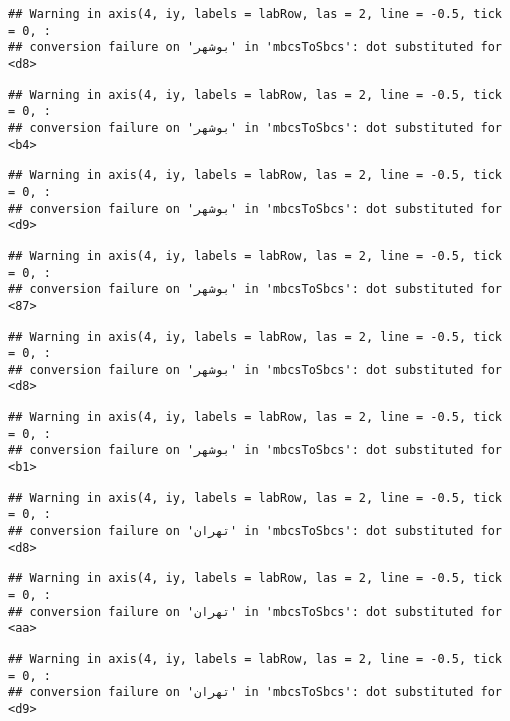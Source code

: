 \documentclass[
]{article}
\begin{document}
\begin{verbatim}
## Warning in axis(4, iy, labels = labRow, las = 2, line = -0.5, tick = 0, :
## conversion failure on 'بوشهر' in 'mbcsToSbcs': dot substituted for <d8>
\end{verbatim}

\begin{verbatim}
## Warning in axis(4, iy, labels = labRow, las = 2, line = -0.5, tick = 0, :
## conversion failure on 'بوشهر' in 'mbcsToSbcs': dot substituted for <b4>
\end{verbatim}

\begin{verbatim}
## Warning in axis(4, iy, labels = labRow, las = 2, line = -0.5, tick = 0, :
## conversion failure on 'بوشهر' in 'mbcsToSbcs': dot substituted for <d9>
\end{verbatim}

\begin{verbatim}
## Warning in axis(4, iy, labels = labRow, las = 2, line = -0.5, tick = 0, :
## conversion failure on 'بوشهر' in 'mbcsToSbcs': dot substituted for <87>
\end{verbatim}

\begin{verbatim}
## Warning in axis(4, iy, labels = labRow, las = 2, line = -0.5, tick = 0, :
## conversion failure on 'بوشهر' in 'mbcsToSbcs': dot substituted for <d8>
\end{verbatim}

\begin{verbatim}
## Warning in axis(4, iy, labels = labRow, las = 2, line = -0.5, tick = 0, :
## conversion failure on 'بوشهر' in 'mbcsToSbcs': dot substituted for <b1>
\end{verbatim}

\begin{verbatim}
## Warning in axis(4, iy, labels = labRow, las = 2, line = -0.5, tick = 0, :
## conversion failure on 'تهران' in 'mbcsToSbcs': dot substituted for <d8>
\end{verbatim}

\begin{verbatim}
## Warning in axis(4, iy, labels = labRow, las = 2, line = -0.5, tick = 0, :
## conversion failure on 'تهران' in 'mbcsToSbcs': dot substituted for <aa>
\end{verbatim}

\begin{verbatim}
## Warning in axis(4, iy, labels = labRow, las = 2, line = -0.5, tick = 0, :
## conversion failure on 'تهران' in 'mbcsToSbcs': dot substituted for <d9>
\end{verbatim}
\end{document}
